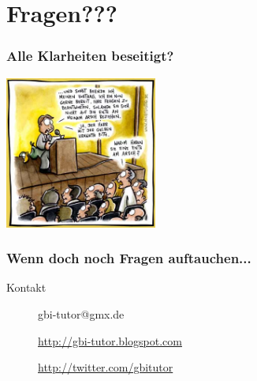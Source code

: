 \section[???]{Fragen???}
\begin{frame}
		\frametitle{Alle Klarheiten beseitigt?}
		\begin{center}
			\includegraphics[height=5cm]{comics/fragen.jpg}\\
		\end{center}
\end{frame}

\begin{frame}
	\frametitle{Wenn doch noch Fragen auftauchen...}
	        \begin{block}{Kontakt}
                \begin{description}
                        \item[] gbi-tutor@gmx.de
                        \item[] \url{http://gbi-tutor.blogspot.com}
                        \item[] \url{http://twitter.com/gbitutor}
                \end{description}
        \end{block}
\end{frame}


